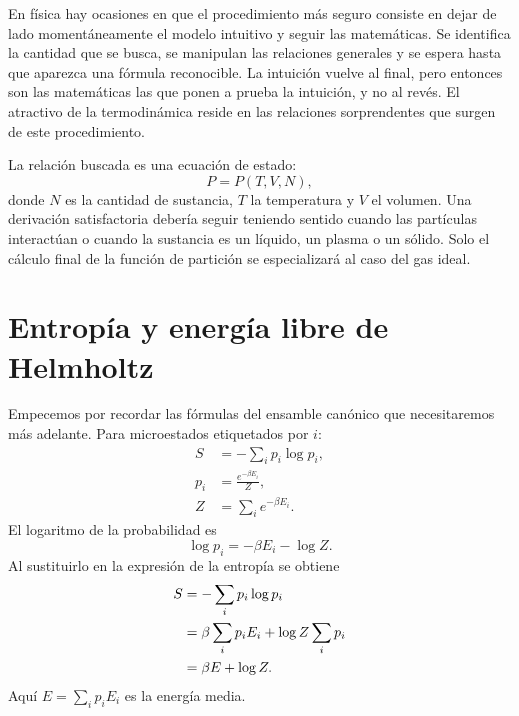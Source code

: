 En física hay ocasiones en que el procedimiento más seguro consiste en dejar de lado momentáneamente el modelo intuitivo y seguir las matemáticas. Se identifica la cantidad que se busca, se manipulan las relaciones generales y se espera hasta que aparezca una fórmula reconocible. La intuición vuelve al final, pero entonces son las matemáticas las que ponen a prueba la intuición, y no al revés. El atractivo de la termodinámica reside en las relaciones sorprendentes que surgen de este procedimiento.

La relación buscada es una ecuación de estado: \begin{equation}
 P=P(T,V,N),
 \label{eq:sm5-equation-of-state-target}
\end{equation} donde \(N\) es la cantidad de sustancia, \(T\) la temperatura y \(V\) el volumen. Una derivación satisfactoria debería seguir teniendo sentido cuando las partículas interactúan o cuando la sustancia es un líquido, un plasma o un sólido. Solo el cálculo final de la función de partición se especializará al caso del gas ideal.

\section{Entropía y energía libre de Helmholtz}

Empecemos por recordar las fórmulas del ensamble canónico que necesitaremos más adelante. Para microestados etiquetados por \(i\): \begin{equation}
 \begin{aligned}
 S&=-\sum_i p_i\log p_i,\\
 p_i&=\frac{e^{-\beta E_i}}{Z},\\
 Z&=\sum_i e^{-\beta E_i}.
 \end{aligned}
 \label{eq:sm5-canonical-definitions}
\end{equation} El logaritmo de la probabilidad es \begin{equation}
 \log p_i=-\beta E_i-\log Z.
 \label{eq:sm5-log-probability}
\end{equation} Al sustituirlo en la expresión de la entropía se obtiene \begin{align}
 S
 &=-\sum_i p_i\log p_i \notag\\
 &=\beta\sum_i p_iE_i+\log Z\sum_i p_i \notag\\
 &=\beta E+\log Z.
 \label{eq:sm5-entropy-log-z}
\end{align} Aquí \(E=\sum_i p_iE_i\) es la energía media.


